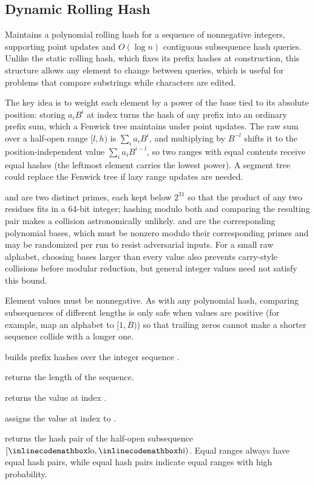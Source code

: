 \subsection{Dynamic Rolling Hash}
\label{sec:3.2.4}
Maintains a polynomial rolling hash for a sequence of nonnegative integers, supporting point updates and $O(\log n)$ contiguous subsequence hash queries. Unlike the static rolling hash, which fixes its prefix hashes at construction, this structure allows any element to change between queries, which is useful for problems that compare substrings while characters are edited.

The key idea is to weight each element by a power of the base tied to its absolute position: storing $a_i B^i$ at index  turns the hash of any prefix into an ordinary prefix sum, which a Fenwick tree maintains under point updates. The raw sum over a half-open range $[l, h)$ is $\sum_i a_i B^i$, and multiplying by $B^{-l}$ shifts it to the position-independent value $\sum_i a_i B^{i - l}$, so two ranges with equal contents receive equal hashes (the leftmost element carries the lowest power). A segment tree could replace the Fenwick tree if lazy range updates are needed.

 and  are two distinct primes, each kept below $2^{31}$ so that the product of any two residues fits in a 64-bit integer; hashing modulo both and comparing the resulting pair makes a collision astronomically unlikely.  and  are the corresponding polynomial bases, which must be nonzero modulo their corresponding primes and may be randomized per run to resist adversarial inputs. For a small raw alphabet, choosing bases larger than every value also prevents carry-style collisions before modular reduction, but general integer values need not satisfy this bound.

Element values must be nonnegative. As with any polynomial hash, comparing subsequences of different lengths is only safe when values are positive (for example, map an alphabet to $[1, B)$) so that trailing zeros cannot make a shorter sequence collide with a longer one.

\begin{compactitem}
  \item {} builds prefix hashes over the integer sequence .
  \item {} returns the length of the sequence.
  \item {} returns the value at index .
  \item {} assigns the value at index  to .
  \item {} returns the hash pair of the half-open subsequence $[{\inlinecodemath{lo}}, {\inlinecodemath{hi}})$. Equal ranges always have equal hash pairs, while equal hash pairs indicate equal ranges with high probability.
\end{compactitem}

